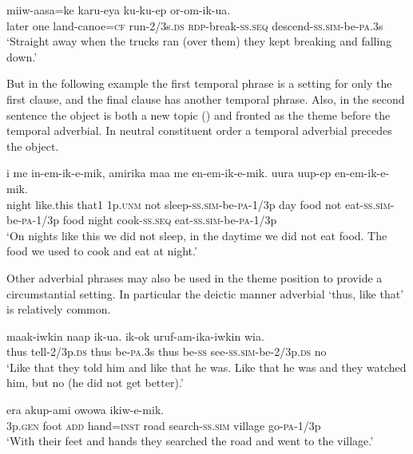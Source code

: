 \ea%
\label{ex:9:x1916}
\gll {}   miiw-aasa=ke  karu-eya  ku-ku-ep or-om-ik-ua.\\
later  one  land-canoe=\textsc{cf}  run-2/3s.\textsc{ds}  \textsc{rdp}-break-\textsc{ss}.\textsc{seq} descend-\textsc{ss}.\textsc{sim}-be-\textsc{pa}.3s     \\
\glt`Straight away when the trucks ran (over them) they kept breaking and falling down.'
\z


But in the following example the first temporal phrase is a setting for only the first clause, and the final clause has another temporal phrase. Also, in the second sentence the object is both a new topic () and fronted as the theme before the temporal adverbial. In neutral constituent order a temporal adverbial precedes the object. 

\ea%
\label{ex:9:x1703}
\gll {}    i  me  in-em-ik-e-mik, amirika  maa  me  en-em-ik-e-mik.   uura  uup-ep  en-em-ik-e-mik.\\
night  like.this  that1  1p.\textsc{unm}  not  sleep-\textsc{ss}.\textsc{sim}-be-\textsc{pa}-1/3p day  food  not  eat-\textsc{ss}.\textsc{sim}-be-\textsc{pa}-1/3p food  night  cook-\textsc{ss}.\textsc{seq}  eat-\textsc{ss}.\textsc{sim}-be-\textsc{pa}-1/3p\\
\glt`On nights like this we did not sleep, in the daytime we did not eat food. The food we used to cook and eat at night.'
\z


Other adverbial phrases may also be used in the theme position to provide a circumstantial setting. In particular the deictic manner adverbial  `thus, like that' is relatively common.

\ea%
\label{ex:9:x1917}
\gll {}  maak-iwkin  naap  ik-ua.    ik-ok uruf-am-ika-iwkin  wia. \\
thus  tell-2/3p.\textsc{ds}  thus  be-\textsc{pa}.3s  thus  be-\textsc{ss} see-\textsc{ss}.\textsc{sim}-be-2/3p.\textsc{ds}  no      \\
\glt`Like that they told him and like that he was. Like that he was and they watched him, but no (he did not get better).'
\z


\ea%
\label{ex:9:x1918}
\gll {}      era  akup-ami  owowa ikiw-e-mik.\\
3p.\textsc{gen}  foot  \textsc{add}  hand=\textsc{inst}  road  search-\textsc{ss}.\textsc{sim}  village go-\textsc{pa}-1/3p\\
\glt`With their feet and hands they searched the road and went to the village.'
\z


